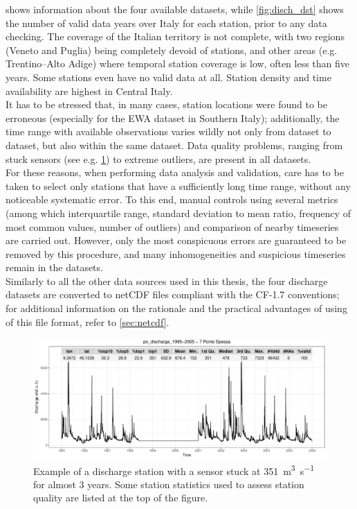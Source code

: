 shows information about the four available datasets, while \cref{fig:disch_dst} shows the number of valid data years over Italy for each station, prior to any data checking.
The coverage of the Italian territory is not complete, with two regions (Veneto and Puglia) being completely devoid of stations, and other areas (e.g. Trentino--Alto Adige) where temporal station coverage is low, often less than five years. Some stations even have no valid data at all.
Station density and time availability are highest in Central Italy.\\
It has to be stressed that, in many cases, station locations were found to be erroneous (especially for the EWA dataset in Southern Italy); additionally, the time range with available observations varies wildly not only from dataset to dataset, but also within the same dataset.
Data quality problems, ranging from stuck sensors (see e.g. \cref{fig:stuck_disc_sensor}) to extreme outliers, are present in all datasets.\\
For these reasons, when performing data analysis and validation, care has to be taken to select only stations that have a sufficiently long time range, without any noticeable systematic error. To this end, manual controls using several metrics (among which interquartile range, standard deviation to mean ratio, frequency of most common values, number of outliers) and comparison of nearby timeseries are carried out. However, only the most conspicuous errors are guaranteed to be removed by this procedure, and many inhomogeneities and suspicious timeseries remain in the datasets.\\
Similarly to all the other data sources used in this thesis, the four discharge datasets are converted to netCDF files compliant with the CF-1.7 conventions; for additional information on the rationale and the practical advantages of using of this file format, refer to \cref{sec:netcdf}.\\

\begin{figure}
    \centering
        \includegraphics[width=\textwidth]{figures/stuck_discahrge_ts}
    \decoRule
    \caption[Example of a discharge station with a stuck sensor]{
    Example of a discharge station with a sensor stuck at \SI{351}{\cubic\metre\per\second} for almost 3 years. Some station statistics used to assess station quality are listed at the top of the figure.
} \label{fig:stuck_disc_sensor}
\end{figure}

